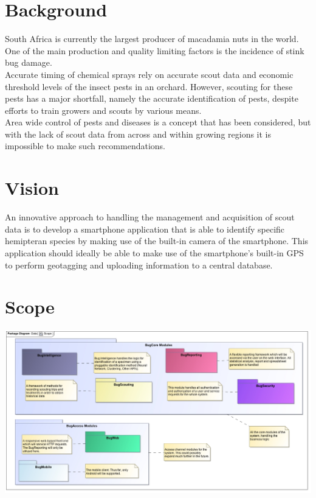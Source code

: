 \documentclass[11pt,a4paper,titlepage]{article}
\begin{document}

\tableofcontents


\pagebreak


\section{Background}
South Africa is currently the largest producer of macadamia nuts in the world. One of the main production and quality limiting factors is the incidence of stink bug damage. 
\\Accurate timing of chemical sprays rely on accurate scout data and economic threshold levels of the insect pests in an orchard. However, scouting for these pests has
a major shortfall, namely the accurate identification of pests, despite efforts to train growers and scouts by various means.\\
Area wide control of pests and diseases is a concept that has been considered, but with the lack of scout data from across and within growing regions it is impossible to make such recommendations. \\

\section{Vision}
An innovative approach to handling the management and acquisition of scout data is to develop a smartphone application that is able to identify specific hemipteran species by making use of the built-in camera of the smartphone. This application should ideally be able to make use of the smartphone’s built-in GPS to perform geotagging and uploading information to a central database.

\section{Scope}
\includegraphics[width=\linewidth]{scope}
\end{document}
